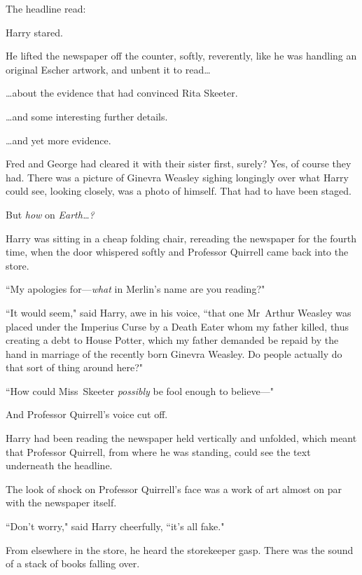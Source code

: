 The headline read:


Harry stared.

He lifted the newspaper off the counter, softly, reverently, like he was handling an original Escher artwork, and unbent it to read{\ldots}

{\ldots}about the evidence that had convinced Rita Skeeter.

{\ldots}and some interesting further details.

{\ldots}and yet more evidence.

Fred and George had cleared it with their sister first, surely? Yes, of course they had. There was a picture of Ginevra Weasley sighing longingly over what Harry could see, looking closely, was a photo of himself. That had to have been staged.

But \emph{how} on \emph{Earth{\ldots}?}

Harry was sitting in a cheap folding chair, rereading the newspaper for the fourth time, when the door whispered softly and Professor Quirrell came back into the store.

``My apologies for—\emph{what} in Merlin's name are you reading?"

``It would seem," said Harry, awe in his voice, ``that one Mr~Arthur Weasley was placed under the Imperius Curse by a Death Eater whom my father killed, thus creating a debt to House Potter, which my father demanded be repaid by the hand in marriage of the recently born Ginevra Weasley. Do people actually do that sort of thing around here?"

``How could Miss~Skeeter \emph{possibly} be fool enough to believe—"

And Professor Quirrell's voice cut off.

Harry had been reading the newspaper held vertically and unfolded, which meant that Professor Quirrell, from where he was standing, could see the text underneath the headline.

The look of shock on Professor Quirrell's face was a work of art almost on par with the newspaper itself.

``Don't worry," said Harry cheerfully, ``it's all fake."

From elsewhere in the store, he heard the storekeeper gasp. There was the sound of a stack of books falling over.

